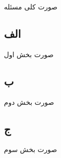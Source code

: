 صورت کلی مسئله 

\subsection*{الف}
صورت بخش اول 

\subsection*{ب}
صورت بخش دوم 

\subsection*{ج}
صورت بخش سوم